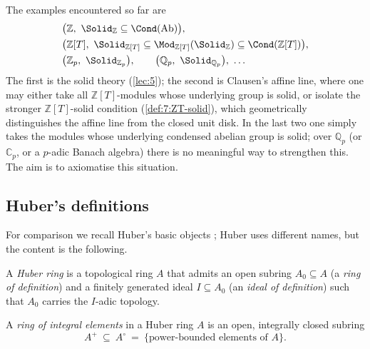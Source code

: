 \begin{remark}
\label{rmk:8:motivation}
The examples encountered so far are
\begin{align}
\label{eq:8:motivation}
&\bigl(\mathbb{Z},\ \Solid_{\mathbb{Z}}\subseteq\Cond(\mathrm{Ab})\bigr),\notag\\
&\bigl(\mathbb{Z}[T],\ \Solid_{\mathbb{Z}[T]}\subseteq\Mod_{\mathbb{Z}[T]}(\Solid_{\mathbb{Z}})\subseteq\Cond(\mathbb{Z}[T])\bigr),\\
&\bigl(\mathbb{Z}_p,\ \Solid_{\mathbb{Z}_p}\bigr),\qquad
\bigl(\mathbb{Q}_p,\ \Solid_{\mathbb{Q}_p}\bigr),\ \dots\notag
\end{align}
The first is the solid theory (\cref{lec:5}); the second is Clausen's affine line,
where one may either take all $\mathbb{Z}[T]$-modules whose underlying group is
solid, or isolate the stronger $\mathbb{Z}[T]$-solid condition
(\cref{def:7:ZT-solid}), which geometrically distinguishes the affine line from
the closed unit disk. In the last two one simply takes the modules whose underlying
condensed abelian group is solid; over $\mathbb{Q}_p$ (or $\mathbb{C}_p$, or a
$p$-adic Banach algebra) there is no meaningful way to strengthen this. The aim
is to axiomatise this situation.
\end{remark}

\subsection{Huber's definitions}

For comparison we recall Huber's basic objects \cite{Huber_1994}; Huber uses
different names, but the content is the following.

\begin{definition}[Huber]
\label{def:8:huber-ring}
A \emph{Huber ring} is a topological ring $A$ that admits an open subring
$A_{0}\subseteq A$ (a \emph{ring of definition}) and a finitely generated ideal
$I\subseteq A_{0}$ (an \emph{ideal of definition}) such that $A_{0}$ carries the
$I$-adic topology.
\end{definition}

\begin{definition}
\label{def:8:ring-of-integral-elements}
A \emph{ring of integral elements} in a Huber ring $A$ is an open, integrally
closed subring
\begin{equation*}
A^{+}\ \subseteq\ A^{\circ}\ =\ \{\text{power-bounded elements of }A\}.
\end{equation*}
\end{definition}

